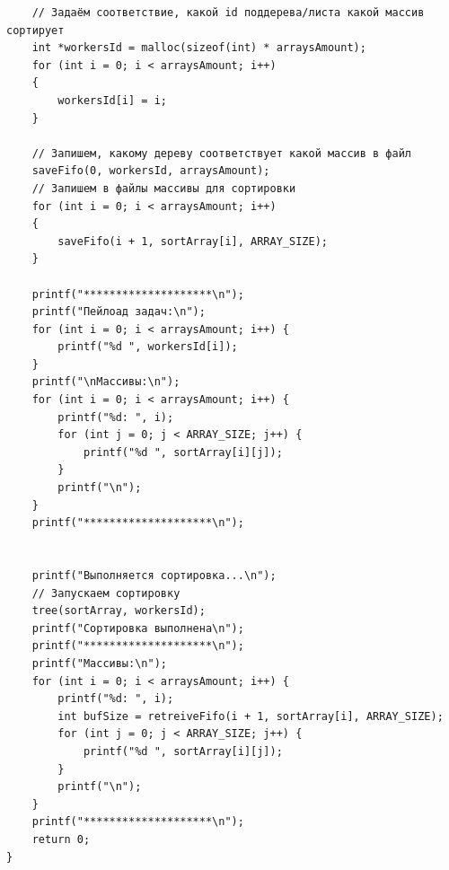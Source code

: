 \documentclass[a4paper,14pt]{extarticle}
\begin{document}
\begin{verbatim}
    // Задаём соответствие, какой id поддерева/листа какой массив сортирует
    int *workersId = malloc(sizeof(int) * arraysAmount);
    for (int i = 0; i < arraysAmount; i++)
    {
        workersId[i] = i;
    }

    // Запишем, какому дереву соответствует какой массив в файл
    saveFifo(0, workersId, arraysAmount);
    // Запишем в файлы массивы для сортировки
    for (int i = 0; i < arraysAmount; i++)
    {
        saveFifo(i + 1, sortArray[i], ARRAY_SIZE);
    }

    printf("********************\n");
    printf("Пейлоад задач:\n");
    for (int i = 0; i < arraysAmount; i++) {
        printf("%d ", workersId[i]);
    }
    printf("\nМассивы:\n");
    for (int i = 0; i < arraysAmount; i++) {
        printf("%d: ", i);
        for (int j = 0; j < ARRAY_SIZE; j++) {
            printf("%d ", sortArray[i][j]);
        }
        printf("\n");
    }
    printf("********************\n");


    printf("Выполняется сортировка...\n");
    // Запускаем сортировку
    tree(sortArray, workersId);
    printf("Сортировка выполнена\n");
    printf("********************\n");
    printf("Массивы:\n");
    for (int i = 0; i < arraysAmount; i++) {
        printf("%d: ", i);
        int bufSize = retreiveFifo(i + 1, sortArray[i], ARRAY_SIZE);
        for (int j = 0; j < ARRAY_SIZE; j++) {
            printf("%d ", sortArray[i][j]);
        }
        printf("\n");
    }
    printf("********************\n");
    return 0;
}
\end{verbatim}
\end{document}
